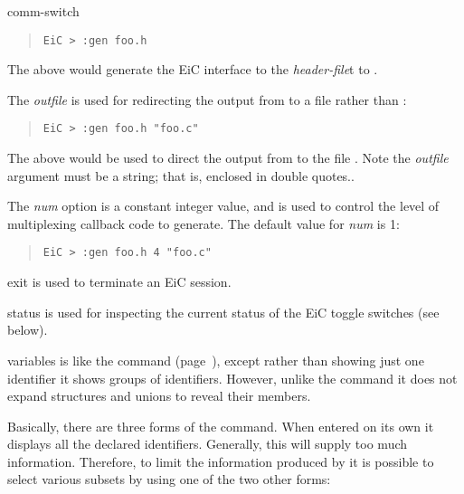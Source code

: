\begin{Ventry}{comm-switch }
\begin{quote}
\begin{verbatim}
EiC > :gen foo.h
\end{verbatim}
\end{quote}


The above would generate the EiC interface to the \textit{header-file}t
 to . 

The \textit{outfile} is used for redirecting the output from  to a file rather
than :

\begin{quote}
\begin{verbatim}
EiC > :gen foo.h "foo.c"
\end{verbatim}
\end{quote}

The above would be used to direct the output from  to the file
. Note the \textit{outfile} argument must be a string; that
is, enclosed in double quotes..

The \textit{num} option is a constant integer value, and is used to control 
the level of multiplexing callback code to generate. The default value
for \textit{num} is 1:

\begin{quote}
\begin{verbatim}
EiC > :gen foo.h 4 "foo.c"
\end{verbatim}
\end{quote}


\item[exit]
\label{item:exit}
         is used to terminate an EiC session.

\item[status] 
\label{item:status}
        is used for inspecting the current status
of the EiC toggle switches (see below).

\item[variables] 
\label{item:variables}
         is like the  command
        (page~\pageref{item:show}), except rather than showing just
        one identifier it shows groups of identifiers. However, unlike the
         command it does not expand structures and unions to
        reveal their members.

        Basically, there are three forms of the 
        command. When entered on its own it displays all the declared
        identifiers. Generally, this will supply too much
        information. Therefore, to limit the information produced by
         it is possible to select various subsets by
        using one of the two other forms:


\end{Ventry}
